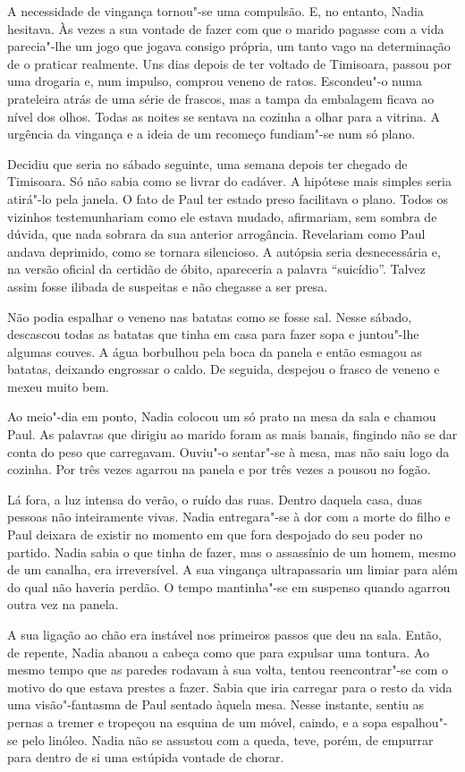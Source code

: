 A necessidade de vingança tornou"-se uma compulsão. E, no entanto, Nadia
hesitava. Às vezes a sua vontade de fazer com que o marido pagasse com a
vida parecia"-lhe um jogo que jogava consigo própria, um tanto vago na
determinação de o praticar realmente. Uns dias depois de ter voltado
de Timisoara, passou por uma drogaria e, num impulso, comprou veneno de
ratos. Escondeu"-o numa prateleira atrás de uma série de frascos, mas a
tampa da embalagem ficava ao nível dos olhos. Todas as noites se
sentava na cozinha a olhar para a vitrina. A urgência da vingança e a
ideia de um recomeço fundiam"-se num só plano.

Decidiu que seria no sábado seguinte, uma semana depois ter chegado de
Timisoara. Só não sabia como se livrar do cadáver. A hipótese mais
simples seria atirá"-lo pela janela. O fato de Paul ter estado preso
facilitava o plano. Todos os vizinhos testemunhariam como ele estava
mudado, afirmariam, sem sombra de dúvida, que nada sobrara da sua
anterior arrogância. Revelariam como Paul andava deprimido, como se
tornara silencioso. A autópsia seria desnecessária e, na versão oficial
da certidão de óbito, apareceria a palavra ``suicídio''. Talvez assim
fosse ilibada de suspeitas e não chegasse a ser presa.

Não podia espalhar o veneno nas batatas como se fosse sal. Nesse sábado,
descascou todas as batatas que tinha em casa para fazer sopa e
juntou"-lhe algumas couves. A água borbulhou pela boca da panela e então
esmagou as batatas, deixando engrossar o caldo. De seguida, despejou o
frasco de veneno e mexeu muito bem.

Ao meio"-dia em ponto, Nadia colocou um só prato na mesa da sala e chamou
Paul. As palavras que dirigiu ao
marido foram as mais banais, fingindo não se dar conta do peso que
carregavam. Ouviu"-o sentar"-se à mesa, mas não saiu logo da cozinha. Por
três vezes agarrou na panela e por três vezes a pousou no fogão.

Lá fora, a luz intensa do verão, o ruído das ruas. Dentro daquela casa,
duas pessoas não inteiramente vivas. Nadia entregara"-se à dor com a
morte do filho e Paul deixara de existir no momento em que fora
despojado do seu poder no partido. Nadia sabia o que tinha de fazer, mas
o assassínio de um homem, mesmo de um canalha, era irreversível. A
sua vingança ultrapassaria um limiar para além do qual não haveria
perdão. O tempo mantinha"-se em suspenso quando agarrou outra vez na
panela.

A sua ligação ao chão era instável nos primeiros passos que deu na sala.
Então, de repente, Nadia abanou a cabeça como que para expulsar uma
tontura. Ao mesmo tempo que as paredes rodavam à sua volta, tentou
reencontrar"-se com o motivo do que estava prestes a fazer. Sabia que
iria carregar para o resto da vida uma visão"-fantasma de Paul sentado
àquela mesa. Nesse instante, sentiu as pernas a tremer e tropeçou na
esquina de um móvel, caindo, e a sopa espalhou"-se pelo linóleo. Nadia
não se assustou com a queda, teve, porém, de empurrar para dentro de si
uma estúpida vontade de chorar.

